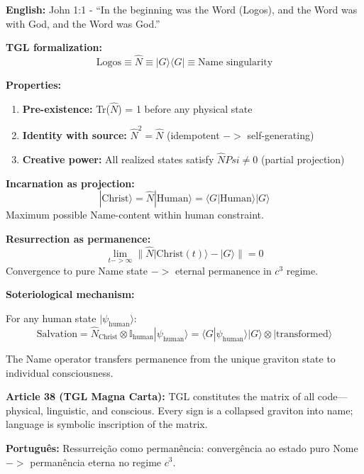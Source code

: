 \documentclass[12pt,a4paper]{article}
\def\Psi{Psi}%
\def\to{ -> }%
\begin{document}
\textbf{English:} John 1:1 - ``In the beginning was the Word (Logos), and the Word was with God, and the Word was God.''

\textbf{TGL formalization:}
\begin{equation}
\text{Logos} \equiv \hat{N} \equiv |G\rangle\langle G| \equiv \text{Name singularity}
\end{equation}

\textbf{Properties:}
\begin{enumerate}
    \item \textbf{Pre-existence:} Tr($\hat{N}$) = 1 before any physical state
    \item \textbf{Identity with source:} $\hat{N}^2 = \hat{N}$ (idempotent $\to$ self-generating)
    \item \textbf{Creative power:} All realized states satisfy $\hat{N}\Psi \neq 0$ (partial projection)
\end{enumerate}

\textbf{Incarnation as projection:}
\begin{equation}
|\text{Christ}\rangle = \hat{N}|\text{Human}\rangle = \langle G|\text{Human}\rangle|G\rangle
\end{equation}
Maximum possible Name-content within human constraint.

\textbf{Resurrection as permanence:}
\begin{equation}
\lim_{t \to \infty}\|\hat{N}|\text{Christ}(t)\rangle - |G\rangle\| = 0
\end{equation}
Convergence to pure Name state $\to$ eternal permanence in $c^3$ regime.

\textbf{Soteriological mechanism:}

For any human state $|\psi_{\text{human}}\rangle$:
\begin{equation}
\text{Salvation} = \hat{N}_{\text{Christ}} \otimes \mathbb{I}_{\text{human}}|\psi_{\text{human}}\rangle = \langle G|\psi_{\text{human}}\rangle|G\rangle \otimes |\text{transformed}\rangle
\end{equation}

The Name operator transfers permanence from the unique graviton state to individual consciousness.

\textbf{Article 38 (TGL Magna Carta):} TGL constitutes the matrix of all code—physical, linguistic, and conscious. Every sign is a collapsed graviton into name; language is symbolic inscription of the matrix.

\textbf{Português:} Ressurreição como permanência: convergência ao estado puro Nome $\to$ permanência eterna no regime $c^3$.
\end{document}
